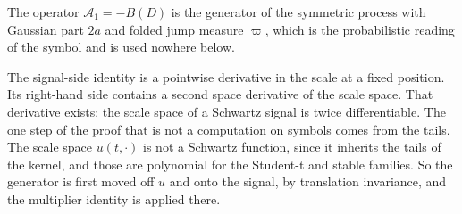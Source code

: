 The operator $\mathcal{A}_1 = -B(D)$ is the generator of the symmetric \Levy{} process with
Gaussian part $2a$ and folded jump measure $\varpi$, which is the probabilistic reading of the
symbol and is used nowhere below.

The signal-side identity is a pointwise derivative in the scale at a fixed position. Its
right-hand side contains a second space derivative of the scale space. That derivative
exists: the scale space of a Schwartz signal is twice differentiable. The one step of the proof that
is not a computation on symbols comes from the tails. The scale space $u(t,\cdot)$ is not a
Schwartz function, since it inherits the tails of the kernel, and those are polynomial for the
Student-t and stable families. So the generator is first moved off $u$ and onto the signal,
by translation invariance, and the multiplier identity is applied there.


